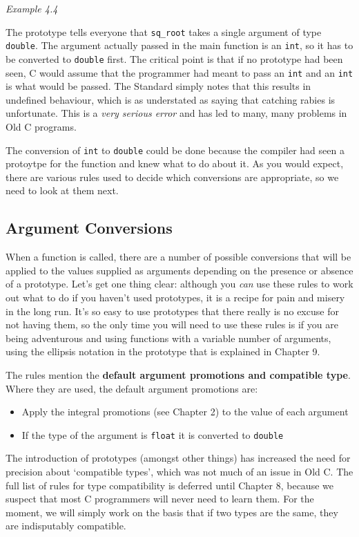 \begin{center}\textit{Example 4.4}\end{center}


   The prototype tells everyone that \texttt{sq\_root} takes a single
    argument of type \texttt{double}. The argument actually passed in
    the main function is an \texttt{int}, so it has to be converted to
    \texttt{double} first. The critical point is that if no prototype
    had been seen, C would assume that the programmer had meant to pass an
    \texttt{int} and an \texttt{int} is what would be passed. The
    Standard simply notes that this results in undefined behaviour, which is
    as understated as saying that catching rabies is unfortunate. This is a
    \textit{very serious error} and has led to many, many problems in Old C
    programs.


   The conversion of \texttt{int} to \texttt{double} could be
    done because the compiler had seen a protoytpe for the function and knew
    what to do about it. As you would expect, there are various rules used
    to decide which conversions are appropriate, so we need to look at them
    next.



  \subsection{Argument Conversions}
   

   When a function is called, there are a number of possible conversions
    that will be applied to the values supplied as arguments depending on
    the presence or absence of a prototype. Let's get one thing clear:
    although you \textit{can} use these rules to work out what to do if you
    haven't used prototypes, it is a recipe for pain and misery in the long
    run. It's so easy to use prototypes that there really is no excuse for
    not having them, so the only time you will need to use these rules is if
    you are being adventurous and using functions with a variable number of
    arguments, using the ellipsis notation in the prototype that is
    explained in Chapter 9.


   The rules mention the \textbf{default argument promotions and compatible
     type}. Where they are used, the default argument promotions
    are:

   \begin{itemize}
    \item Apply the integral promotions (see Chapter 2) to the
     value of each argument
    \item If the type of the argument is \texttt{float} it is converted to
     \texttt{double}
   \end{itemize}
   The introduction of prototypes (amongst other things) has increased
    the need for precision about `compatible types', which was not
    much of an issue in Old C. The full list of rules for type compatibility
    is deferred until Chapter 8, because we suspect that most C
    programmers will never need to learn them. For the moment, we will
    simply work on the basis that if two types are the same, they are
    indisputably compatible.



